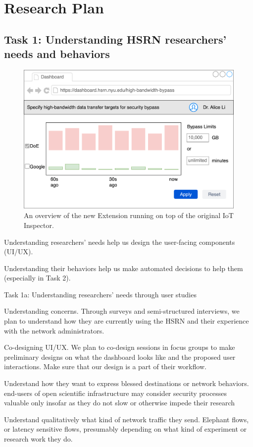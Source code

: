 \section{Research Plan}

\subsection{Task 1: Understanding HSRN researchers’ needs and behaviors}

\begin{figure}[t]
    \centering
    \includegraphics[width=0.5\linewidth]{figures/dashboard.png}
    \caption{An overview of the new Extension running on top of the original IoT Inspector.}
    \label{fig:dashboard}
    \vspace{-0.5cm}
\end{figure}


Understanding researchers’ needs help us design the user-facing components (UI/UX).

Understanding their behaviors help us make automated decisions to help them (especially in Task 2).

Task 1a: Understanding researchers’ needs through user studies

Understanding concerns. Through surveys and semi-structured interviews, we plan to understand how they are currently using the HSRN and their experience with the network administrators.

Co-designing UI/UX. We plan to co-design sessions in focus groups to make preliminary designs on what the dashboard looks like and the proposed user interactions. Make sure that our design is a part of their workflow.

Understand how they want to express blessed destinations or network behaviors. end-users of open scientific infrastructure may consider security processes valuable only insofar as they do not slow or otherwise impede their research

Understand qualitatively what kind of network traffic they send. Elephant flows, or latency sensitive flows, presumably depending on what kind of experiment or research work they do.

